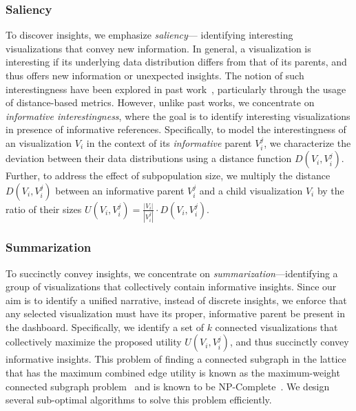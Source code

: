 \subsubsection{Saliency}
To discover insights, we emphasize \emph{saliency}--- identifying interesting visualizations that convey new information. In general, a visualization is interesting if its underlying data distribution differs from that of its parents, and thus offers new information or unexpected insights. The notion of such interestingness have been explored in past work~\cite{Vartak2015,Correll2016,Itti2009}, particularly through the usage of distance-based metrics. However, unlike past works, we concentrate on \emph{informative interestingness}, where the goal is to identify interesting visualizations in presence of informative references. Specifically, to model the interestingness of an visualization $V_i$ in the context of its \emph{informative} parent $V_i^j$, we characterize the deviation between their data distributions using a distance function $D(V_i, V_i^j)$. Further, to address the effect of subpopulation size, we multiply the distance $D(V_i, V_i^j)$ between an informative parent $V_i^j$ and a child visualization $V_i$ by the ratio of their sizes  $U(V_i, V_i^j) = \frac{|V_i|}{|V_i^{j}|} \cdot D(V_i, V_i^j)$.
\subsubsection{Summarization}
To succinctly convey insights, we concentrate on \emph{summarization}---identifying a group of visualizations that collectively contain informative insights. Since our aim is to identify a unified narrative, instead of discrete insights, we enforce that any selected visualization must have its proper, informative parent be present in the dashboard. Specifically, we identify a set of $k$ connected visualizations that collectively maximize the proposed utility $U(V_i, V_i^j)$, and thus succinctly convey informative insights. This problem of finding a connected subgraph in the lattice that has the maximum combined edge utility is known as the maximum-weight connected subgraph problem~\cite{ErnstAlthaus2009} and is known to be NP-Complete~\cite{Parameswaran2010}. We design several sub-optimal algorithms to solve this problem efficiently. 